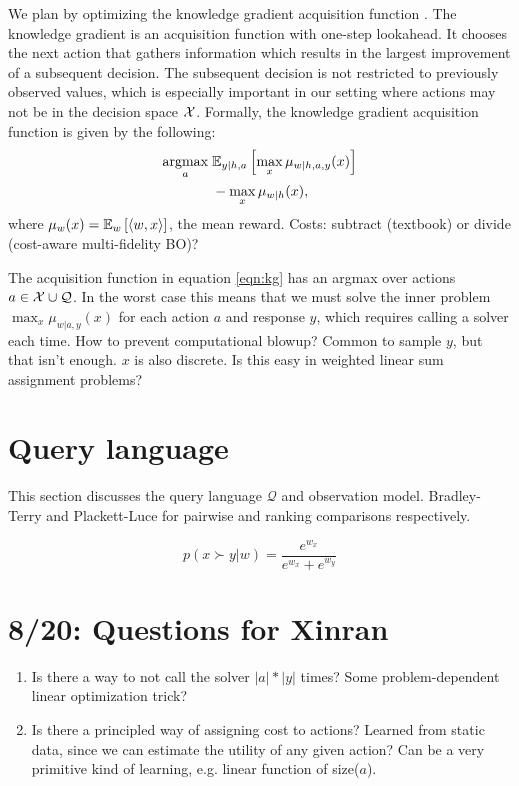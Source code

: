 \documentclass[11pt]{article}
\begin{document}
We plan by optimizing the knowledge gradient acquisition function \citep{kg}.
The knowledge gradient is an acquisition function with one-step lookahead.
It chooses the next action that gathers information which results in the largest improvement of a subsequent decision.
The subsequent decision is not restricted to previously observed values,
which is especially important in our setting where actions may not be in the decision space $\mathcal{X}$.
Formally, the knowledge gradient acquisition function is given by the following:
\begin{equation}
\label{eqn:kg}
\begin{aligned}
\operatorname*{argmax}_a \; & \mathbb{E}_{y|h,a}\left[\max_x \mu_{w|h,a,y}(x)\right]\\
&- \max_{x} \mu_{w|h}(x),
\end{aligned}
\end{equation}
where $\mu_w(x) = \mathbb{E}_{w}\left[\langle w,x \rangle\right]$, the mean reward.
Costs: subtract (textbook) or divide (cost-aware multi-fidelity BO)?

The acquisition function in equation \ref{eqn:kg} has an argmax over actions $a \in \mathcal{X} \cup \mathcal{Q}$.
In the worst case this means that we must solve the inner problem
$\max_x \mu_{w|a,y}(x)$ for each action $a$ and response $y$,
which requires calling a solver each time.
How to prevent computational blowup?
Common to sample $y$, but that isn't enough.
$x$ is also discrete. Is this easy in weighted linear sum assignment problems?

\section{Query language}
This section discusses the query language $\mathcal{Q}$ and observation model.
Bradley-Terry and Plackett-Luce for pairwise and ranking comparisons respectively.

\begin{equation}
p(x \succ y | w)= \frac{e^{w_x}}{e^{w_x} + e^{w_y}}
\end{equation}

\section{8/20: Questions for Xinran}
\begin{enumerate}
    \item Is there a way to not call the solver $|a|*|y|$ times? Some problem-dependent linear optimization trick?
    \item Is there a principled way of assigning cost to actions? Learned from static data, since we can estimate the utility of any given action? Can be a very primitive kind of learning, e.g. linear function of size($a$).
\end{enumerate}
\end{document}
